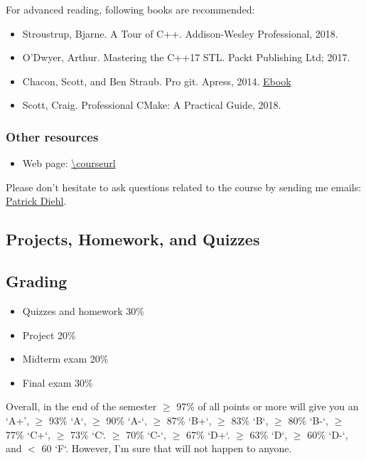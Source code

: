 \documentclass[11pt,letterpaper]{article}
\begin{document}
For advanced reading, following books are recommended:

\begin{itemize}
\item Stroustrup, Bjarne. A Tour of C++. Addison-Wesley Professional, 2018.
\item O'Dwyer, Arthur. Mastering the C++17 STL. Packt Publishing Ltd; 2017.
\item Chacon, Scott, and Ben Straub. Pro git. Apress, 2014. \href{https://github.com/progit/progit2/releases/download/2.1.146/progit.pdf}{Ebook}
\item Scott, Craig. Professional CMake: A Practical Guide, 2018.
\end{itemize}

\subsubsection*{Other resources}

\begin{itemize}
\item Web page: \url{\courseurl}
\end{itemize}

Please don’t hesitate to ask questions related to the course by sending me emails: \href{mailto:patrickdiehl@lsu.edu}{Patrick Diehl}. 

\subsection*{Projects, Homework, and Quizzes}

\subsection*{Grading}
\begin{itemize}
\item Quizzes and homework 30\%
\item Project 20\%
\item Midterm exam 20\%
\item Final exam 30\%
\end{itemize}
Overall, in the end of the semester $\geq$ 97\% of all points or more will give you an ‘A+’,  $\geq$ 93\% `A`,  $\geq$ 90\% `A-`,  $\geq$  87\% `B+`,  $\geq$  83\% `B`,  $\geq$  80\% `B-`,  $\geq$ 77\% `C+`,  $\geq$ 73\% `C`.  $\geq$  70\% `C-`,  $\geq$  67\% `D+`.  $\geq$  63\% `D`,  $\geq$  60\% `D-`, and $<$ 60 `F`. However, I’m sure that will not happen to anyone.
\end{document}
